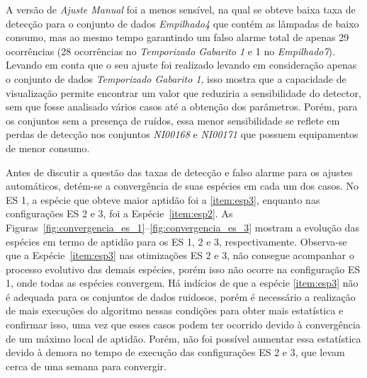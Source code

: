 A versão de \emph{Ajuste Manual} foi a menos sensível, na qual se
obteve baixa taxa de detecção para o conjunto de dados
\emph{Empilhado4} que contém as lâmpadas de baixo consumo, mas ao
mesmo tempo garantindo um falso alarme total de apenas 29 ocorrências
(28 ocorrências no \emph{Temporizado Gabarito 1} e 1 no
\emph{Empilhado7}). Levando em conta que o seu ajuste foi realizado
levando em consideração apenas o conjunto de dados \emph{Temporizado
Gabarito 1}, isso mostra que a capacidade de visualização permite
encontrar um valor que reduziria a sensibilidade do detector, sem que
fosse analisado vários casos até a obtenção dos parâmetros.  Porém,
para os conjuntos sem a presença de ruídos, essa menor sensibilidade
se reflete em perdas de detecção nos conjuntos \emph{NI00168} e
\emph{NI00171} que possuem equipamentos de menor consumo.

Antes de discutir a questão das taxas de detecção e falso alarme para
os ajustes automáticos, detém-se a convergência de suas espécies em
cada um dos casos. No ES 1, a espécie que obteve maior aptidão foi a
\ref{item:esp3}, enquanto nas configurações ES 2 e 3, foi a
Espécie~\ref{item:esp2}. As
Figuras~\ref{fig:convergencia_es_1}--\ref{fig:convergencia_es_3}
mostram a evolução das espécies em termo de aptidão para os ES 1, 2 e
3, respectivamente. Observa-se que a Espécie~\ref{item:esp3} nas
otimizações ES 2 e 3, não consegue acompanhar o processo evolutivo das
demais espécies, porém isso não ocorre na configuração ES 1, onde
todas as espécies convergem. Há indícios de que a espécie
\ref{item:esp3} não é adequada para os conjuntos de dados ruidosos,
porém é necessário a realização de mais execuções do algoritmo nessas
condições para obter mais estatística e confirmar isso, uma vez que
esses casos podem ter ocorrido devido à convergência de um máximo
local de aptidão. Porém, não foi possível aumentar essa estatística
devido à demora no tempo de execução das configurações ES 2 e 3, que
levam cerca de uma semana para convergir.

